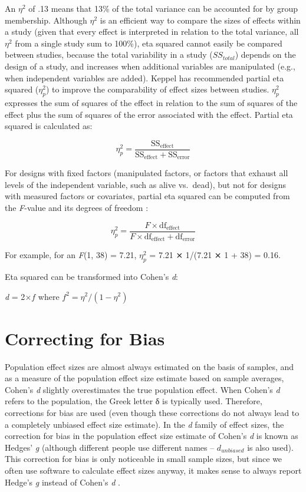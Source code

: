 \documentclass[
  oneside]{krantz}
\begin{document}
An \(\eta^2\) of .13 means that 13\% of the total variance can be accounted for by group membership. Although \(\eta^2\) is an efficient way to compare the sizes of effects within a study (given that every effect is interpreted in relation to the total variance, all \(\eta^2\) from a single study sum to 100\%), eta squared cannot easily be compared between studies, because the total variability in a study (\(SS_{total}\)) depends on the design of a study, and increases when additional variables are manipulated (e.g., when independent variables are added). Keppel \citep{keppel_design_1991} has recommended partial eta squared (\(\eta_{p}^{2}\)) to improve the comparability of effect sizes between studies. \(\eta_{p}^{2}\) expresses the sum of squares of the effect in relation to the sum of squares of the effect plus the sum of squares of the error associated with the effect. Partial eta squared is calculated as:

\[\eta_{p}^{2} = \frac{\text{SS}_{\text{effect}}}{\text{SS}_{\text{effect}} + \text{SS}_{\text{error}}}\]

For designs with fixed factors (manipulated factors, or factors that exhaust all levels of the independent variable, such as alive vs.~dead), but not for designs with measured factors or covariates, partial eta squared can be computed from the \emph{F}-value and its degrees of freedom \citep{cohen_statistical_1988}:

\[\eta_{p}^{2} = \frac{F \times \text{df}_{\text{effect}}}{{F \times \text{df}}_{\text{effect}} + \text{df}_{\text{error}}}\]

For example, for an \emph{F}(1, 38) = 7.21, \(\eta_{p}^{2}\) = 7.21 ⨯ 1/(7.21 ⨯ 1 +
38) = 0.16.

Eta squared can be transformed into Cohen's \emph{d}:

\emph{d} = 2\(\times f\) where \(f^{2} = \eta^{2}/(1 - \eta^{2})\)

\hypertarget{correcting-for-bias}{%
\section{Correcting for Bias}\label{correcting-for-bias}}

Population effect sizes are almost always estimated on the basis of samples, and as a measure of the population effect size estimate based on sample averages, Cohen's \emph{d} slightly overestimates the true population effect. When Cohen's \emph{d} refers to the population, the Greek letter δ is typically used. Therefore, corrections for bias are used (even though these corrections do not always lead to a completely unbiased effect size estimate). In the \emph{d} family of effect sizes, the correction for bias in the population effect size estimate of Cohen's \emph{d} is known as Hedges' \emph{g} (although different people use different names -- \(d_{unbiased}\) is also used). This correction for bias is only noticeable in small sample sizes, but since we often use software to calculate effect sizes anyway, it makes sense to always report Hedge's \emph{g} instead of Cohen's \emph{d} \citep{thompson_effect_2007}.
\end{document}
